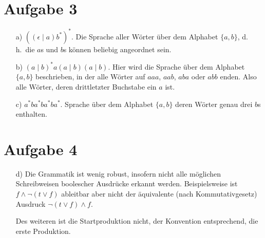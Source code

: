 \documentclass[11pt,a4paper,ngerman]{article}
\renewcommand\dh{d.\,h.\ }
\begin{document}
\section*{Aufgabe 3}
\begin{itemize}
	\item[a)] $\left((\epsilon\mid a)b^*\right)^*$. Die Sprache aller Wörter über dem Alphabet $\{a,b\}$, \dh die $a$s und $b$s können beliebig angeordnet sein.
	
	\item[b)] $(a\mid b)^* a(a\mid b)(a\mid b)$.  Hier wird die Sprache über dem Alphabet $\{a,b\}$ beschrieben, in der alle Wörter auf $aaa$, $aab$, $aba$ oder $abb$ enden. Also alle Wörter, deren drittletzter Buchstabe ein $a$ ist.
	
	\item[c)] $a^* ba^* ba^* ba^*$. Sprache über dem Alphabet $\{a,b\}$ deren Wörter genau drei $b$s enthalten.
\end{itemize}

\section*{Aufgabe 4}
\begin{itemize}
	\item[d)] Die Grammatik ist wenig robust, insofern nicht alle möglichen Schreibweisen boolescher Ausdrücke erkannt werden. Beispielsweise ist $f \wedge \neg (t \vee f)$ ableitbar aber nicht der äquivalente (nach Kommutativgesetz) Ausdruck $\neg (t \vee f) \wedge f$.
	
	Des weiteren ist die Startproduktion nicht, der Konvention entsprechend, die erste Produktion.
\end{itemize}
\end{document}
